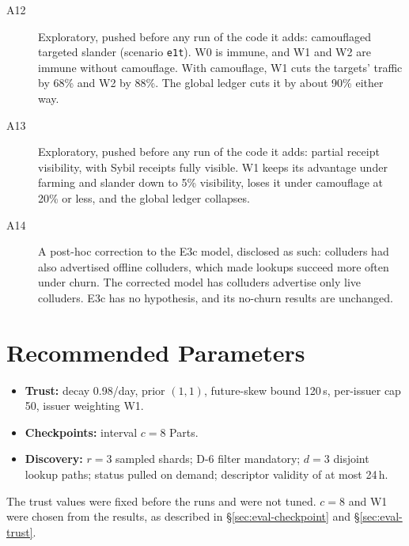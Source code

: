 \begin{description}
\item[A12] Exploratory, pushed before any run of the code it adds:
  camouflaged targeted slander (scenario \texttt{e1t}). W0 is immune, and
  W1 and W2 are immune without camouflage. With camouflage, W1 cuts the
  targets' traffic by 68\% and W2 by 88\%. The global ledger cuts it by
  about 90\% either way.
\item[A13] Exploratory, pushed before any run of the code it adds:
  partial receipt visibility, with Sybil receipts fully visible. W1 keeps
  its advantage under farming and slander down to 5\% visibility, loses
  it under camouflage at 20\% or less, and the global ledger collapses.
\item[A14] A post-hoc correction to the E3c model, disclosed as such:
  colluders had also advertised offline colluders, which made lookups
  succeed more often under churn. The corrected model has colluders
  advertise only live colluders. E3c has no hypothesis, and its no-churn
  results are unchanged.
\end{description}

\section{Recommended Parameters}
\label{app:params}
\begin{itemize}
\item \textbf{Trust:} decay 0.98/day, prior $(1,1)$, future-skew bound
  120\,s, per-issuer cap 50, issuer weighting W1.
\item \textbf{Checkpoints:} interval $c{=}8$ Parts.
\item \textbf{Discovery:} $r{=}3$ sampled shards; D-6 filter mandatory;
  $d{=}3$ disjoint lookup paths; status pulled on demand; descriptor
  validity of at most 24\,h.
\end{itemize}
The trust values were fixed before the runs and were not tuned. $c{=}8$ and W1 were chosen from the results, as described in \S\ref{sec:eval-checkpoint} and \S\ref{sec:eval-trust}.
